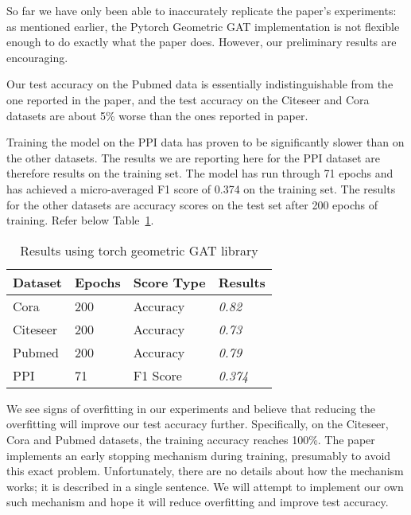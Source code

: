 So far we have only been able to inaccurately replicate the paper's
experiments: as mentioned earlier, the Pytorch Geometric GAT implementation is
not flexible enough to do exactly what the paper does.
However, our preliminary results are encouraging.

Our test accuracy on the Pubmed data is essentially
indistinguishable from the one reported in the paper, and the test accuracy on
the Citeseer and Cora datasets are about 5\% worse than the ones reported in
paper.

Training the model on the PPI data has proven to be significantly slower than on the other datasets.
The results we are reporting here for the PPI dataset are therefore results on the training set.
The model has run through 71 epochs and has achieved a micro-averaged F1 score of 0.374 on the training set.
The results for the other datasets are accuracy scores on the test set after 200 epochs of training.
Refer below Table~\ref{tab:results-table}.

\begin{table}
    \centering
    \begin{tabular}{@{}llll@{}}
        \toprule
        \textbf{Dataset} & \textbf{Epochs} & \textbf{Score Type} & \textbf{Results} \\
        \midrule
        Cora             & 200             & Accuracy            & \textit{0.82}    \\
        Citeseer         & 200             & Accuracy            & \textit{0.73}    \\
        Pubmed           & 200             & Accuracy            & \textit{0.79}    \\
        PPI              & 71              & F1 Score            & \textit{0.374}   \\
        \bottomrule

    \end{tabular}
    \caption{Results using torch geometric GAT library}
    \label{tab:results-table}
\end{table}

We see signs of overfitting in our experiments and believe that reducing the overfitting will improve our test accuracy further.
Specifically, on the Citeseer, Cora and Pubmed datasets, the training accuracy reaches 100\%.
The paper implements an early stopping mechanism during training, presumably to avoid this exact problem.
Unfortunately, there are no details about how the mechanism works; it is described in a single sentence.
We will attempt to implement our own such mechanism and hope it will reduce overfitting and improve test accuracy.
